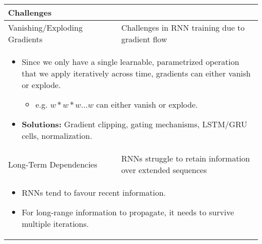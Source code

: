 \begin{summary}
\begin{center}
\begin{tabular}{ll}
            \midrule 
            \textbf{Challenges} & \\ 
            \toprule
            Vanishing/Exploding Gradients & Challenges in RNN training due to gradient flow \\ 
            \multicolumn{2}{p{\linewidth}}{
            \begin{itemize}
                \item Since we only have a single learnable, parametrized operation that we apply iteratively across time, gradients can either vanish or explode.
                \begin{itemize}
                    \item e.g. $w*w*w \ldots w$ can either vanish or explode.
                \end{itemize}
                \item \textbf{Solutions:} Gradient clipping, gating mechanisms, LSTM/GRU cells, normalization. 
            \end{itemize}} \\
            \midrule 
            Long-Term Dependencies & RNNs struggle to retain information over extended sequences \\
            \multicolumn{2}{p{\linewidth}}{
            \begin{itemize}
                \item RNNs tend to favour recent information. 
                \item For long-range information to propagate, it needs to survive multiple iterations.
            \end{itemize}} \\
            \bottomrule
        \end{tabular}
    \end{center}
\end{summary}

